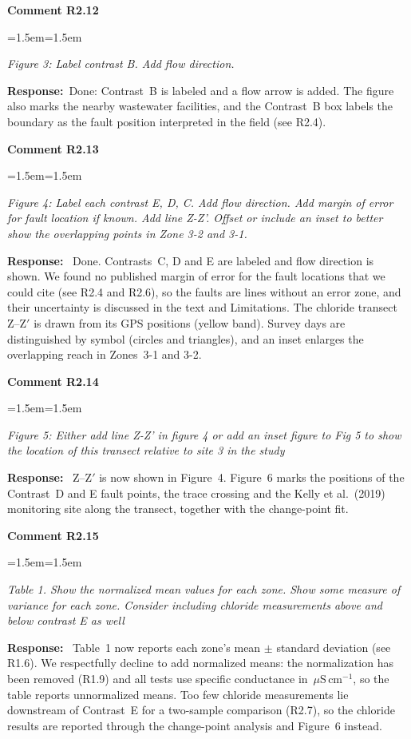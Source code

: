 \documentclass[11pt]{article}
\newcommand{\uScm}{\,$\mu$S\,cm$^{-1}$}
\newenvironment{comment}[1]
  {\par\medskip\noindent\textbf{Comment #1}\par
   \begin{list}{}{\leftmargin=1.5em\rightmargin=1.5em}\item\color{commentcolor}\itshape}
  {\end{list}}
\newenvironment{response}
  {\par\noindent\textbf{Response:}\ }
  {\par}
\begin{document}
\begin{comment}{R2.12}
Figure 3: Label contrast B. Add flow direction.
\end{comment}
\begin{response}Done: Contrast~B is labeled and a flow arrow is added. The figure also marks the nearby wastewater facilities, and the Contrast~B box labels the boundary as the fault position interpreted in the field (see R2.4).\end{response}

\begin{comment}{R2.13}
Figure 4: Label each contrast E, D, C. Add flow direction. Add margin of error for fault
location if known. Add line Z-Z'. Offset or include an inset to better show the
overlapping points in Zone 3-2 and 3-1.
\end{comment}
\begin{response}
Done. Contrasts~C, D and E are labeled and flow direction is shown. We found no published
margin of error for the fault locations that we could cite (see R2.4 and R2.6), so the faults are
lines without an error zone, and their uncertainty is discussed in the text and Limitations. The
chloride transect Z--Z$'$ is drawn from its GPS positions (yellow band). Survey days are
distinguished by symbol (circles and triangles), and an inset enlarges the overlapping reach in
Zones~3-1 and 3-2.
\end{response}

\begin{comment}{R2.14}
Figure 5: Either add line Z-Z' in figure 4 or add an inset figure to Fig 5 to show the
location of this transect relative to site 3 in the study
\end{comment}
\begin{response}
Z--Z$'$ is now shown in Figure~4. Figure~6 marks the positions of the Contrast~D and E fault
points, the trace crossing and the Kelly et al.\ (2019) monitoring site along the
transect, together with the change-point fit.
\end{response}

\begin{comment}{R2.15}
Table 1. Show the normalized mean values for each zone. Show some measure of variance for
each zone. Consider including chloride measurements above and below contrast E as well
\end{comment}
\begin{response}
Table~1 now reports each zone's mean $\pm$ standard deviation (see R1.6). We respectfully
decline to add normalized means: the normalization has been removed (R1.9) and all tests use
specific conductance in \uScm, so the table reports unnormalized means. Too few chloride
measurements lie downstream of Contrast~E for a two-sample comparison (R2.7), so the chloride
results are reported through the change-point analysis and Figure~6 instead.
\end{response}
\end{document}
